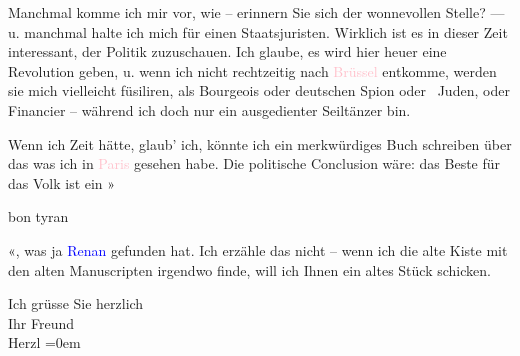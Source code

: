                Manchmal komme ich mir vor, wie \label{K_L03826-3v}\label{K_L03826-3} – erinnern Sie sich der wonnevollen
               Stelle? — u. manchmal halte ich mich für einen Staatsjuristen. Wirklich ist es in
               dieser Zeit interessant, der Politik zuzuschauen. Ich glaube, es wird hier heuer eine
               Revolution geben, u. wenn ich nicht rechtzeitig nach \textcolor{pink}{Brüssel}\ledrightnote{\textcolor{pink}{Brüssel}} entkomme, werden sie mich vielleicht füsiliren, als Bourgeois oder
               deutschen Spion oder  Juden, oder Financier –
               während ich doch nur ein ausgedienter Seiltänzer bin.\pend
           
\pstart
           Wenn ich Zeit hätte, glaub' ich, {\pb}könnte
               ich ein merkwürdiges Buch schreiben über das was ich in \textcolor{pink}{Paris}\ledrightnote{\textcolor{pink}{Paris}} gesehen habe. Die politische Conclusion wäre: das Beste
               für das Volk ist ein »\begin{otherlanguage}{french}bon tyran\end{otherlanguage}«, was ja \textcolor{blue}{Renan}\ledrightnote{\textcolor{blue}{Ernest Renan}} gefunden hat. Ich erzähle das nicht
                  \label{K_L03826-4v}\label{K_L03826-4} – wenn ich die alte Kiste mit
               den alten Manuscripten irgendwo finde, will ich Ihnen ein altes Stück schicken.\pend
           
\pstart
           Ich grüsse Sie herzlich{\\[\baselineskip]} Ihr Freund{\\[\baselineskip]}\spacefill\mbox{Herzl}\pend
           \leftskip=0em{}\endnumbering{}
\begin{anhang}
\end{anhang}
      